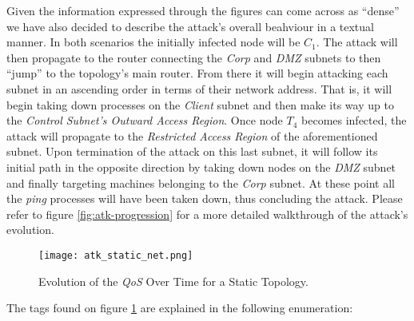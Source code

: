             Given the information expressed through the figures can come across as ``dense'' we have also decided to describe the attack's overall beahviour in a textual manner. In both scenarios the initially infected node will be $C_1$. The attack will then propagate to the router connecting the \textit{Corp} and \textit{DMZ} subnets to then ``jump'' to the topology's main router. From there it will begin attacking each subnet in an ascending order in terms of their network address. That is, it will begin taking down processes on the \textit{Client} subnet and then make its way up to the \textit{Control Subnet's Outward Access Region}. Once node $T_4$ becomes infected, the attack will propagate to the \textit{Restricted Access Region} of the aforementioned subnet. Upon termination of the attack on this last subnet, it will follow its initial path in the opposite direction by taking down nodes on the \textit{DMZ} subnet and finally targeting machines belonging to the \textit{Corp} subnet. At these point all the \textit{ping} processes will have been taken down, thus concluding the attack. Please refer to figure \ref{fig:atk-progression} for a more detailed walkthrough of the attack's evolution.\\


            \begin{figure}
                \centering
                \texttt{[image: atk\_static\_net.png]}
                \caption[\textit{QoS} on a Static Topology]{Evolution of the \textit{QoS} Over Time for a Static Topology.}
                \label{fig:static-atk}
            \end{figure}

            The tags found on figure \ref{fig:static-atk} are explained in the following enumeration:\\

